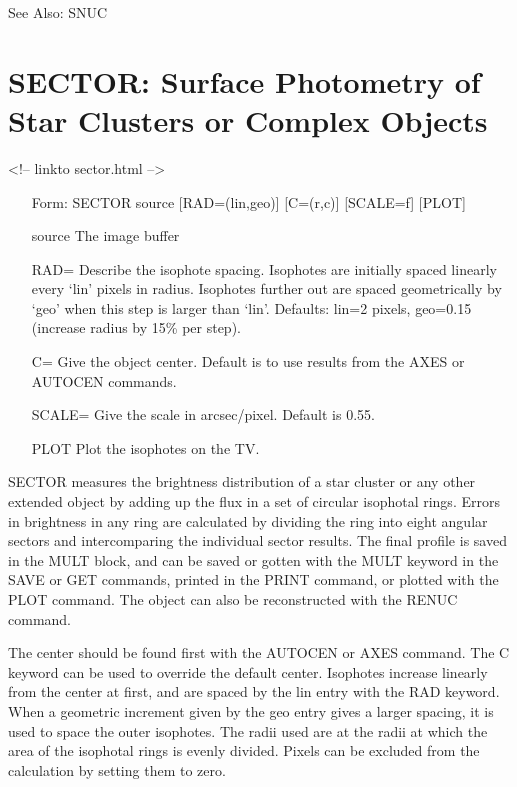 See Also: SNUC


\section{SECTOR: Surface Photometry of Star Clusters or Complex Objects}
\begin{rawhtml}
<!-- linkto sector.html -->
\end{rawhtml}
\begin{itemize}
  \item[Form: SECTOR source {[RAD=(lin,geo)]} {[C=(r,c)]} {[SCALE=f]} 
       {[PLOT]}\hfill]{}
  \item[source]{The image buffer}
  \item[RAD=]{Describe the isophote spacing. Isophotes are initially spaced
       linearly every `lin' pixels in radius. Isophotes further out are
       spaced geometrically by `geo' when this step is larger than `lin'.
       Defaults: lin=2 pixels, geo=0.15 (increase radius by 15\% per
       step).}
  \item[C=]{Give the object center.  Default is to use results from
       the AXES or AUTOCEN commands.}
  \item[SCALE=]{Give the scale in arcsec/pixel. Default is 0.55.}
  \item[PLOT]{Plot the isophotes on the TV.}
\end{itemize}

SECTOR measures the brightness distribution of a star cluster or any other
extended object by adding up the flux in a set of circular isophotal rings.
Errors in brightness in any ring are calculated by dividing the ring into
eight angular sectors and intercomparing the individual sector results.
The final profile is saved in the MULT block, and can be saved or gotten
with the MULT keyword in the SAVE or GET commands, printed in the PRINT
command, or plotted with the PLOT command.  The object can also be
reconstructed with the RENUC command.

The center should be found first with the AUTOCEN or AXES command.  The C
keyword can be used to override the default center.  Isophotes increase
linearly from the center at first, and are spaced by the lin entry with the
RAD keyword.  When a geometric increment given by the geo entry gives a
larger spacing, it is used to space the outer isophotes.  The radii used
are at the radii at which the area of the isophotal rings is evenly
divided.  Pixels can be excluded from the calculation by setting them to
zero.

